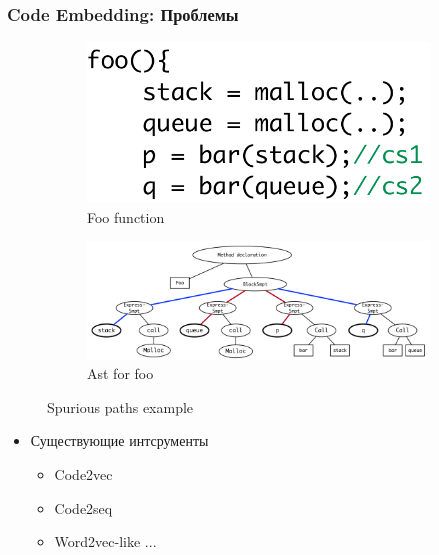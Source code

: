 \documentclass[xcolor=table,english]{beamer}
\begin{document}
\begin{frame}[fragile] \frametitle{Code Embedding: Проблемы}
    \begin{minipage}[m]{\linewidth}
        \begin{figure}
            \centering
            \begin{subfigure}[b]{0.35\textwidth}
                \includegraphics[width=\textwidth]{figures/code_for_ast.png}
                \caption{Foo function}
            \end{subfigure}
            \hfill
            \begin{subfigure}[b]{0.55\textwidth}
                \includegraphics[width=\textwidth]{figures/ast_approach.png}
                \caption{Ast for foo}
            \end{subfigure}
            \caption{Spurious paths example}
        \end{figure}
    \end{minipage}\hfill
    \begin{minipage}[m]{\linewidth}
        \begin{itemize}
        \item Существующие интсрументы
            {
            \begin{itemize}
                \item Code2vec
                \item Code2seq
                \item Word2vec-like ...

\end{itemize}}
\end{itemize}
\end{minipage}
\end{frame}
\end{document}

